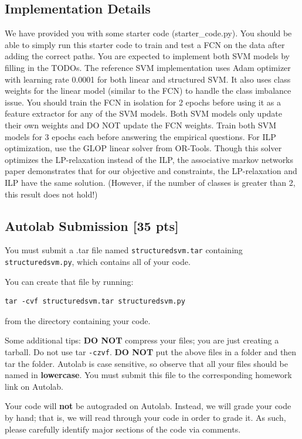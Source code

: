 \documentclass[11pt,addpoints,answers]{exam}
\numberwithin{equation}{section} %
\numberwithin{figure}{section} %
\numberwithin{table}{section} %
\newcommand{\pts}[1]{\textbf{[#1 pts]}}
\begin{document}
\subsection{Implementation Details}
We have provided you with some starter code (starter\_code.py). You should be able to simply run this starter code to train and test a FCN on the data after adding the correct paths. You are expected to implement both SVM models by filling in the TODOs. The reference SVM implementation uses Adam optimizer with learning rate 0.0001 for both linear and structured SVM. It also uses class weights for the linear model (similar to the FCN) to handle the class imbalance issue. You should train the FCN in isolation for 2 epochs before using it as a feature extractor for any of the SVM models. Both SVM models only update their own weights and DO NOT update the FCN weights. Train both SVM models for 3 epochs each before answering the empirical questions. For ILP optimization, use the GLOP linear solver from OR-Tools. Though this solver optimizes the LP-relaxation instead of the ILP, the associative markov networks paper demonstrates that for our objective and constraints, the LP-relaxation and ILP have the same solution. (However, if the number of classes is greater than 2, this result does not hold!)

\subsection{Autolab Submission \pts{35}}

You must submit a .tar file named \lstinline{structuredsvm.tar} containing \lstinline{structuredsvm.py}, which contains all of your code.

You can create that file by running:
\begin{lstlisting}
tar -cvf structuredsvm.tar structuredsvm.py
\end{lstlisting}
from the directory containing your code.

Some additional tips: {\bf DO NOT} compress your files; you are just
creating a tarball. Do not use tar \texttt{-czvf}.  {\bf DO NOT} put
the above files in a folder and then tar the folder.  Autolab is case
sensitive, so observe that all your files should be named in {\bf
  lowercase}. You must submit this file to the corresponding homework
link on Autolab. 

Your code will \textbf{not} be autograded on Autolab. Instead, we will grade your code by hand; that is, we will read through your code in order to grade it. As such, please carefully identify major sections of the code via comments. 
\end{document}
